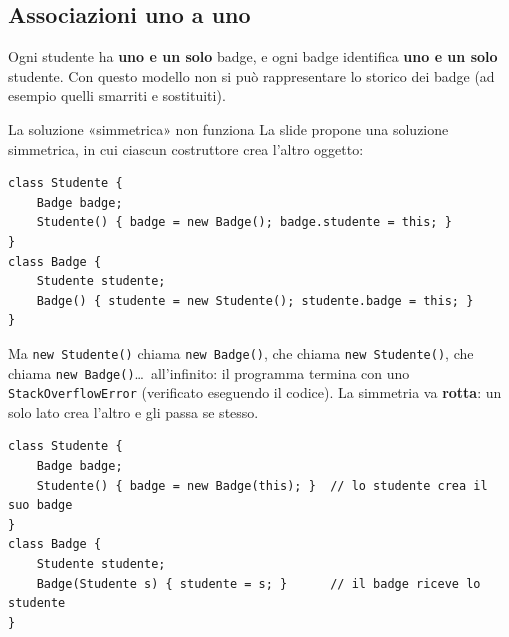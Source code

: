 \subsection{Associazioni uno a uno}

Ogni studente ha \textbf{uno e un solo} badge, e ogni badge identifica \textbf{uno e un solo} studente. Con questo modello non si
può rappresentare lo storico dei badge (ad esempio quelli smarriti e sostituiti).

\begin{center}
\end{center}

\begin{errorbox}{{La soluzione «simmetrica» non funziona}}
La slide propone una soluzione simmetrica, in cui ciascun costruttore crea l'altro oggetto:
\begin{lstlisting}[style=java]
class Studente {
    Badge badge;
    Studente() { badge = new Badge(); badge.studente = this; }
}
class Badge {
    Studente studente;
    Badge() { studente = new Studente(); studente.badge = this; }
}
\end{lstlisting}
Ma \texttt{new Studente()} chiama \texttt{new Badge()}, che chiama \texttt{new Studente()}, che chiama \texttt{new Badge()}\ldots\
all'infinito: il programma termina con uno \texttt{StackOverflowError} (verificato eseguendo il codice). La simmetria va
\textbf{rotta}: un solo lato crea l'altro e gli passa se stesso.
\begin{lstlisting}[style=java]
class Studente {
    Badge badge;
    Studente() { badge = new Badge(this); }  // lo studente crea il suo badge
}
class Badge {
    Studente studente;
    Badge(Studente s) { studente = s; }      // il badge riceve lo studente
}
\end{lstlisting}
\end{errorbox}

